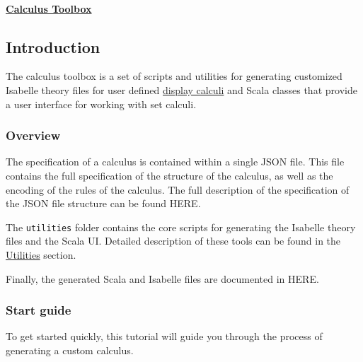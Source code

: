 \paragraph{\href{/}{Calculus Toolbox}}


\subsection{Introduction}

The calculus toolbox is a set of scripts and utilities for generating
customized Isabelle theory files for user defined
\href{/doc/calculi.html}{display calculi} and Scala classes that provide
a user interface for working with set calculi.

\subsubsection{Overview}\label{overview}

The specification of a calculus is contained within a single JSON file.
This file contains the full specification of the structure of the
calculus, as well as the encoding of the rules of the calculus. The full
description of the specification of the JSON file structure can be found
HERE.

The \texttt{utilities} folder contains the core scripts for generating
the Isabelle theory files and the Scala UI. Detailed description of
these tools can be found in the \href{/doc/utilities.html}{Utilities}
section.

Finally, the generated Scala and Isabelle files are documented in HERE.

\subsubsection{Start guide}\label{start-guide}

To get started quickly, this tutorial will guide you through the process
of generating a custom calculus.

